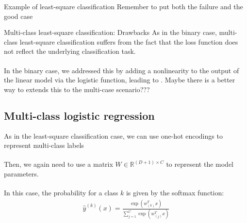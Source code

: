 \begin{parag}{Example of least-square classification}
    Remember to put both the failure and the good case
\end{parag}



\begin{parag}{Multi-class least-square classification: Drawbacks}
    As in the binary case, multi-class least-square classification suffers from the fact that the loss function does not reflect the underlying classification task.\\
	$ $\\
	In the binary case, we addressed this by adding a nonlinearity to the output of the linear model via the logistic function, leading to . Maybe there is a better way to extends this to the multi-case scenario???
\end{parag}

\subsection{Multi-class logistic regression}
    As in the least-square classification case, we can use one-hot encodings to represent multi-class labels\\
	$ $\\
	Then, we again need to use a matrix $W \in \mathbb{R}^{\left(D + 1\right) \times C}$ to represent the model parameters.\\
	$ $\\
	In this case, the probability for a class $k$ is given by the softmax function:
	\begin{align*} 
		\hat{y}^{\left(k\right)}\left(x\right) = \frac{\exp\left(w_{\left(k\right)}^{T}x\right)}{\sum_{j= 1}^{C}\exp\left(w_{\left(j\right)}^{T}x\right)}
	\end{align*}

